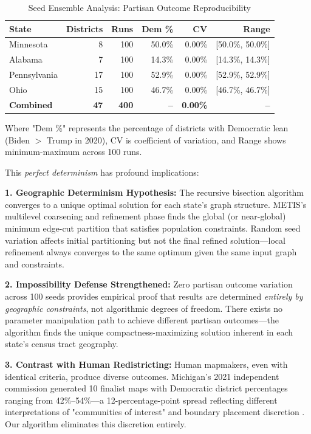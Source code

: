 \begin{table}[h]
\centering
\caption{Seed Ensemble Analysis: Partisan Outcome Reproducibility}
\label{tab:seed_ensemble}
\begin{tabular}{lrrrrr}
\toprule
\textbf{State} & \textbf{Districts} & \textbf{Runs} & \textbf{Dem \%} & \textbf{CV} & \textbf{Range} \\
\midrule
Minnesota & 8 & 100 & 50.0\% & 0.00\% & [50.0\%, 50.0\%] \\
Alabama & 7 & 100 & 14.3\% & 0.00\% & [14.3\%, 14.3\%] \\
Pennsylvania & 17 & 100 & 52.9\% & 0.00\% & [52.9\%, 52.9\%] \\
Ohio & 15 & 100 & 46.7\% & 0.00\% & [46.7\%, 46.7\%] \\
\midrule
\textbf{Combined} & \textbf{47} & \textbf{400} & \textbf{--} & \textbf{0.00\%} & \textbf{--} \\
\bottomrule
\end{tabular}
\end{table}

Where "Dem \%" represents the percentage of districts with Democratic lean (Biden $>$ Trump in 2020), CV is coefficient of variation, and Range shows minimum-maximum across 100 runs.

This \textit{perfect determinism} has profound implications:

\textbf{1. Geographic Determinism Hypothesis:} The recursive bisection algorithm converges to a unique optimal solution for each state's graph structure. METIS's multilevel coarsening and refinement phase finds the global (or near-global) minimum edge-cut partition that satisfies population constraints. Random seed variation affects initial partitioning but not the final refined solution—local refinement always converges to the same optimum given the same input graph and constraints.

\textbf{2. Impossibility Defense Strengthened:} Zero partisan outcome variation across 100 seeds provides empirical proof that results are determined \textit{entirely by geographic constraints}, not algorithmic degrees of freedom. There exists no parameter manipulation path to achieve different partisan outcomes—the algorithm finds the unique compactness-maximizing solution inherent in each state's census tract geography.

\textbf{3. Contrast with Human Redistricting:} Human mapmakers, even with identical criteria, produce diverse outcomes. Michigan's 2021 independent commission generated 10 finalist maps with Democratic district percentages ranging from 42\%--54\%—a 12-percentage-point spread reflecting different interpretations of "communities of interest" and boundary placement discretion \cite{michigan2021commission}. Our algorithm eliminates this discretion entirely.

